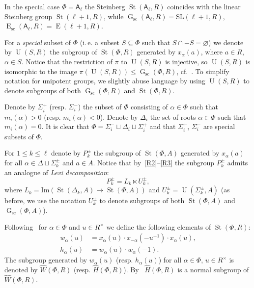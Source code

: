 \documentclass[oneside, 10pt]{amsart}
\DeclareMathOperator{\St}{St}
\DeclareMathOperator{\E}{E}
\DeclareMathOperator{\G}{G}
\DeclareMathOperator{\UU}{U}
\newcommand{\Gsc}{\G_\mathrm{sc}}
\newcommand{\Esc}{\E_\mathrm{sc}}
\newcommand{\rA}{\mathsf{A}}
\newcommand{\StW}{\widehat{W}}
\newcommand{\StH}{\widehat{H}}
\numberwithin{equation}{section}
\numberwithin{thm}{section}
\numberwithin{lemma}{section}
\theoremstyle{definition}
\theoremstyle{remark}
\begin{document}
In the special case $\Phi =\rA_\ell$ the Steinberg $\St(\rA_\ell, R)$ coincides with the linear Steinberg group $\St(\ell + 1, R)$, while
$\Gsc(\rA_\ell, R) = \mathrm{SL}(\ell + 1, R)$, $\Esc(\rA_\ell, R) = \E(\ell + 1, R)$.

For a \textit{special} subset of $\Phi$ (i.\,e. a subset $S \subseteq \Phi$ such that $S \cap -S = \varnothing$)
we denote by $\UU(S, R)$ the subgroup of $\St(\Phi, R)$ generated by $x_\alpha(a)$, where $a \in R$, $\alpha \in S$.
Notice that the restriction of $\pi$ to $\UU(S, R)$ is injective, so $\UU(S, R)$ is isomorphic to the image $\pi(\UU(S, R)) \leq \Gsc(\Phi, R)$, cf.~\cite[\S~1A]{St78}.
To simplify notation for unipotent groups, we slightly abuse language by using $\UU(S, R)$ to denote subgroups of both $\Gsc(\Phi, R)$ and $\St(\Phi, R)$.

Denote by $\Sigma^+_i$ (resp. $\Sigma^-_i$) the subset of $\Phi$ consisting of $\alpha \in \Phi$ such that $m_i(\alpha) > 0$ (resp. $m_i(\alpha) < 0$).
Denote by $\Delta_i$ the set of roots $\alpha \in \Phi$ such that $m_i(\alpha) = 0$.
It is clear that $\Phi = \Sigma_i^- \sqcup \Delta_i \sqcup \Sigma_i^+$ and that $\Sigma_i^+$, $\Sigma_i^-$ are special subsets of $\Phi$.

For $1 \leq k \leq \ell$ denote by $P_k^\pm$ the subgroup of $\St(\Phi, A)$ generated by $x_\alpha(a)$ for all $\alpha \in \Delta \sqcup \Sigma^\pm_k$ and $a \in A$.
Notice that by~\eqref{R2}--\eqref{R3} the subgroup $P_k^\pm$ admits an analogue of \textit{Levi decomposition}:
\begin{equation} \label{eq:levi-decomp} P_k^\pm = L_k \ltimes U_k^\pm, \end{equation}
where $L_k = \mathrm{Im}(\St(\Delta_k, A) \to \St(\Phi, A))$ and $U_k^\pm = \UU(\Sigma_k^\pm, A)$
(as before, we use the notation $U_k^\pm$ to denote subgroups of both $\St(\Phi, A)$ and $\Gsc(\Phi, A)$).

Following~\cite{Ma69} for $\alpha\in\Phi$ and $u \in R^\times$ we define the following elements of $\St(\Phi, R)$:
\begin{align} w_\alpha(u) & =  x_\alpha(u) \cdot x_{-\alpha}(-u^{-1}) \cdot x_\alpha(u), \label{eq:w-definition} \\
h_\alpha(u) & =  w_\alpha(u) \cdot w_\alpha(-1).  \label{eq:h-definition} \end{align}
The subgroup generated by $w_\alpha(u)$ (resp. $h_\alpha(u)$) for all $\alpha\in \Phi$, $u \in R^\times$ is denoted by $\StW(\Phi, R)$ (resp. $\StH(\Phi, R)$).
By~\cite[Lemme~5.2]{Ma69} $\StH(\Phi, R)$ is a normal subgroup of $\StW(\Phi, R)$.
\end{document}
